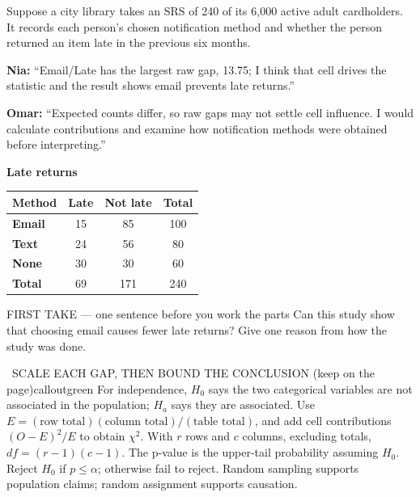\documentclass[11pt]{article}
\begin{document}


Suppose a city library takes an SRS of 240 of its 6,000 active adult cardholders. It records each person's chosen notification method and whether the person returned an item late in the previous six months.\par\smallskip \textbf{Nia:} ``Email/Late has the largest raw gap, 13.75; I think that cell drives the statistic and the result shows email prevents late returns.''\par \textbf{Omar:} ``Expected counts differ, so raw gaps may not settle cell influence. I would calculate contributions and examine how notification methods were obtained before interpreting.''\par
\begin{center}
\textbf{Late returns}\par\smallskip
\begin{tabular}{|l|c|c|c|}
\hline
\textbf{Method} & \textbf{Late} & \textbf{Not late} & \textbf{Total} \\ \hline
\textbf{Email} & 15 & 85 & 100 \\ \hline
\textbf{Text} & 24 & 56 & 80 \\ \hline
\textbf{None} & 30 & 30 & 60 \\ \hline
\textbf{Total} & 69 & 171 & 240 \\ \hline
\end{tabular}
\end{center}
\begin{firsttakebox}{FIRST TAKE --- one sentence before you work the parts}
Can this study show that choosing email causes fewer late returns? Give one reason from how the study was done.
\workspace{0.9in}
\end{firsttakebox}

\begin{callout}{\IconBook\ SCALE EACH GAP, THEN BOUND THE CONCLUSION (keep on the page)}{calloutgreen}
For independence, $H_0$ says the two categorical variables are not associated in the population;
$H_a$ says they are associated. Use $E=(\text{row total})(\text{column total})/(\text{table total})$,
and add cell contributions $(O-E)^2/E$ to obtain $\chi^2$.
With $r$ rows and $c$ columns, excluding totals, $df=(r-1)(c-1)$.
The p-value is the upper-tail probability assuming $H_0$. Reject $H_0$ if $p\leq\alpha$;
otherwise fail to reject. Random sampling supports population claims; random assignment supports causation.
\end{callout}
\end{document}
